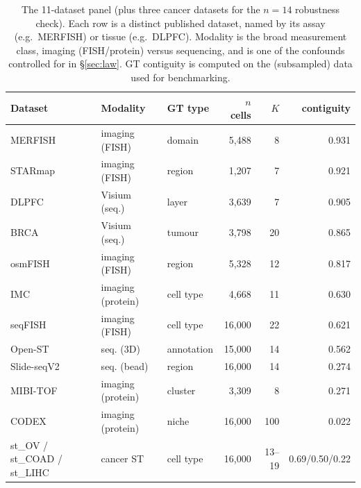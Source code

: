 \documentclass[journal]{IEEEtran}
\begin{document}
\begin{table}[!t]\centering\small
\caption{The 11-dataset panel (plus three cancer datasets for the $n{=}14$ robustness check). Each row is
a distinct published dataset, named by its assay (e.g.\ MERFISH) or tissue (e.g.\ DLPFC). Modality
is the broad measurement class, imaging (FISH/protein) versus sequencing, and is one of the
confounds controlled for in \S\ref{sec:law}. GT contiguity is computed on the (subsampled) data used for
benchmarking.}
\label{tab:data}
\begin{tabular}{lllrrr}
\toprule
Dataset & Modality & GT type & $n$ cells & $K$ & contiguity\\
\midrule
MERFISH      & imaging (FISH)      & domain     & 5{,}488  & 8  & 0.931\\
STARmap      & imaging (FISH)      & region     & 1{,}207  & 7  & 0.921\\
DLPFC        & Visium (seq.)       & layer      & 3{,}639  & 7  & 0.905\\
BRCA         & Visium (seq.)       & tumour     & 3{,}798  & 20 & 0.865\\
osmFISH      & imaging (FISH)      & region     & 5{,}328  & 12 & 0.817\\
IMC          & imaging (protein)   & cell type  & 4{,}668  & 11 & 0.630\\
seqFISH      & imaging (FISH)      & cell type  & 16{,}000 & 22 & 0.621\\
Open-ST       & seq. (3D)           & annotation & 15{,}000 & 14 & 0.562\\
Slide-seqV2  & seq. (bead)         & region     & 16{,}000 & 14 & 0.274\\
MIBI-TOF     & imaging (protein)   & cluster    & 3{,}309  & 8  & 0.271\\
CODEX        & imaging (protein)   & niche      & 16{,}000 & 100& 0.022\\
\midrule
st\_OV / st\_COAD / st\_LIHC & cancer ST & cell type & 16{,}000 & 13--19 & 0.69/0.50/0.22\\
\bottomrule
\end{tabular}
\end{table}
\end{document}
